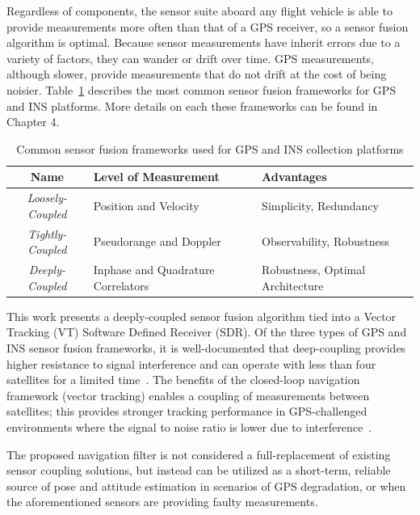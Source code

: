 Regardless of components, the sensor suite aboard any flight vehicle is able to provide measurements more often than that of a GPS receiver, so a sensor fusion algorithm is optimal. Because sensor measurements have inherit errors due to a variety of factors, they can wander or drift over time. GPS measurements, although slower, provide measurements that do not drift at the cost of being noisier. Table~\ref{tbl:sensorfusionframeworks} describes the most common sensor fusion frameworks for GPS and INS platforms. More details on each these frameworks can be found in Chapter 4.
\begin{table}[!ht]\label{tbl:sensorfusionframeworks}
    \caption{Common sensor fusion frameworks used for GPS and INS collection platforms}
    \centering
    \begin{tabular}{cll}
        \toprule
        \textbf{Name}            & \textbf{Level of Measurement}      & \textbf{Advantages}              \\
        \midrule
        \textit{Loosely-Coupled} & Position and Velocity              & Simplicity, Redundancy           \\
        \textit{Tightly-Coupled} & Pseudorange and Doppler            & Observability, Robustness        \\
        \textit{Deeply-Coupled}  & Inphase and Quadrature Correlators & Robustness, Optimal Architecture \\
        \bottomrule
    \end{tabular}
\end{table}

This work presents a deeply-coupled sensor fusion algorithm tied into a Vector Tracking (VT) Software Defined Receiver (SDR). Of the three types of GPS and INS sensor fusion frameworks, it is well-documented that deep-coupling provides higher resistance to signal interference and can operate with less than four satellites for a limited time~\cite{wattsGPSGLONASSL12019}. The benefits of the closed-loop navigation framework (vector tracking) enables a coupling of measurements between satellites; this provides stronger tracking performance in GPS-challenged environments where the signal to noise ratio is lower due to interference~\cite{grierPositionNavigationTiming}.

The proposed navigation filter is not considered a full-replacement of existing sensor coupling solutions, but instead can be utilized as a short-term, reliable source of pose and attitude estimation in scenarios of GPS degradation, or when the aforementioned sensors are providing faulty measurements.

